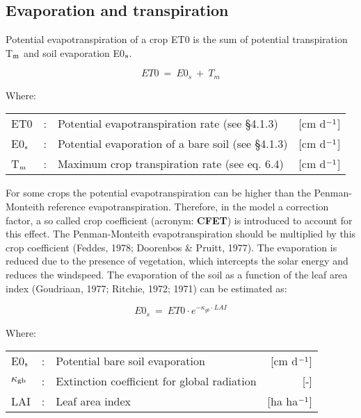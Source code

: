 \subsection{Evaporation and transpiration}
Potential evapotranspiration of a crop ET0 is the sum of potential transpiration T$_{{\rm m}}$ and
soil evaporation E0$_{{\rm s}}$.

\begin{equation}
\label{eq:6.2}
ET0 ~=~ E0_{s} ~+~ T_{m} 
\end{equation}

Where:\\[5pt]
\begin{tabularx}{\textwidth}{llXr}
	ET0 &:& Potential evapotranspiration rate (see \S 4.1.3) & [cm d$^{{\rm -1}}$]\\
	E0$_{{\rm s}}$ &:& Potential evaporation of a bare soil (see \S 4.1.3)  & [cm d$^{{\rm -1}}$]\\
	T$_{{\rm m}}$ &:& Maximum crop transpiration rate (see eq. 6.4)  & [cm d$^{{\rm -1}}$]\\
\end{tabularx}

For some crops the potential evapotranspiration can be higher than the Penman-Monteith
reference evapotranspiration. 
Therefore, in the model a correction factor, a so called  crop coefficient
(acronym: {\bf CFET}) is introduced to account for this effect. The Penman-Monteith evapotranspiration
should be multiplied by this crop coefficient (Feddes, 1978; Doorenbos \& Pruitt, 1977).
The evaporation is reduced due to the presence of vegetation, which intercepts the solar
energy and reduces the windspeed. The evaporation of the soil as a function of the leaf
area index (Goudriaan, 1977; Ritchie, 1972; 1971) can be estimated as:

\begin{equation}
\label{eq:6.3}
E0 _{s} ~=~ ET0 \cdot e^{-\kappa_{gb} \cdot LAI}
\end{equation}

Where:\\[5pt]
\begin{tabularx}{\textwidth}{llXr}
	E0$_{{\rm s}}$ &:& Potential bare soil evaporation  & [cm d$^{{\rm -1}}$]\\
	$\kappa$$_{{\rm gb}}$ &:& Extinction coefficient for global radiation  & [-]\\
	LAI &:& Leaf area index  & [ha ha$^{{\rm -1}}$]\\
\end{tabularx}

